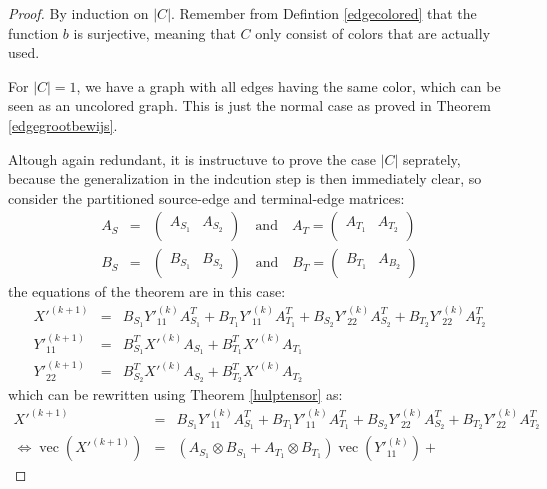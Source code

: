 \documentclass[a4paper,11pt]{report}
\newcommand{\vect}{\operatorname{vec}}
\begin{document}
\begin{proof}
  By induction on $|C|$. Remember from Defintion \ref{edgecolored} that the 
  function $b$ is surjective, meaning that $C$ only consist of colors that are 
  actually used.
  
  For $|C| = 1$, we have a graph with all edges having the same color, which can 
  be seen as an uncolored graph. This is just the normal case as proved in 
  Theorem \ref{edgegrootbewijs}.
  
  Altough again redundant, it is instructuve to prove the case $|C|$ seprately, 
  because the generalization in the indcution step is then immediately clear, so 
  consider the partitioned source-edge and terminal-edge matrices:
  \begin{eqnarray*}
    A_S &=& \begin{pmatrix}
A_{S_1} & A_{S_2}\\
\end{pmatrix} \quad \text{and} \quad  A_T = \begin{pmatrix}
A_{T_1} & A_{T_2}\\
\end{pmatrix}\\
    B_S &=& \begin{pmatrix}
B_{S_1} & B_{S_2}\\
\end{pmatrix} \quad \text{and} \quad  B_T = \begin{pmatrix}
B_{T_1} & A_{B_2}\\
\end{pmatrix}
  \end{eqnarray*}
  the equations of the theorem are in this case:
   \begin{eqnarray*}
   X'^{(k+1)} &=& B_{S_1}Y'^{(k)}_{11} A^T_{S_1} +  B_{T_1}Y'^{(k)}_{11} 
   A^T_{T_1} +  B_{S_2}Y'^{(k)}_{22} A^T_{S_2} +  B_{T_2}Y'^{(k)}_{22} 
   A^T_{T_2}\\
   Y'^{(k+1)}_{11} &=& B^T_{S_1}X'^{(k)}A_{S_1} + B^T_{T_1}X'^{(k)}A_{T_1}\\
   Y'^{(k+1)}_{22} &=& B^T_{S_2}X'^{(k)}A_{S_2} + B^T_{T_2}X'^{(k)}A_{T_2}
    \end{eqnarray*}
which can be rewritten using Theorem \ref{hulptensor} as:
\begin{eqnarray*}
  X'^{(k+1)} &=& B_{S_1}Y'^{(k)}_{11} A^T_{S_1} +  B_{T_1}Y'^{(k)}_{11} 
   A^T_{T_1} +  B_{S_2}Y'^{(k)}_{22} A^T_{S_2} +  B_{T_2}Y'^{(k)}_{22} 
   A^T_{T_2} \\
  \Leftrightarrow\vect(X'^{(k+1)}) &=& (A_{S_1} \otimes  B_{S_1} + A_{T_1} \otimes B_{T_1})\vect(Y'^{(k)}_{11}) + 

\end{eqnarray*}
\end{proof}
\end{document}
